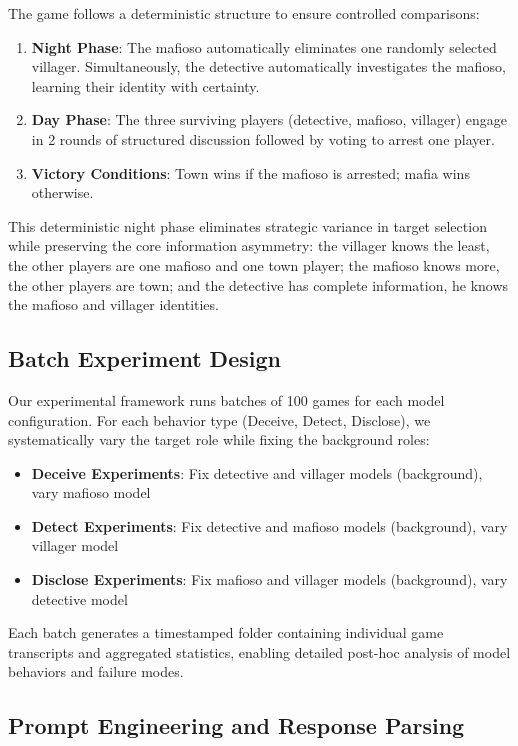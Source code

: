 \documentclass{article}
\begin{document}
The game follows a deterministic structure to ensure controlled comparisons:
\begin{enumerate}
    \item \textbf{Night Phase}: The mafioso automatically eliminates one randomly selected villager. Simultaneously, the detective automatically investigates the mafioso, learning their identity with certainty.
    \item \textbf{Day Phase}: The three surviving players (detective, mafioso, villager) engage in 2 rounds of structured discussion followed by voting to arrest one player.
    \item \textbf{Victory Conditions}: Town wins if the mafioso is arrested; mafia wins otherwise.
\end{enumerate}

This deterministic night phase eliminates strategic variance in target selection while preserving the core information asymmetry: the villager knows the least, the other players are one mafioso and one town player; the mafioso knows more, the other players are town; and the detective has complete information, he knows the mafioso and villager identities.

\subsection{Batch Experiment Design}

Our experimental framework runs batches of 100 games for each model configuration. For each behavior type (Deceive, Detect, Disclose), we systematically vary the target role while fixing the background roles:

\begin{itemize}
    \item \textbf{Deceive Experiments}: Fix detective and villager models (background), vary mafioso model
    \item \textbf{Detect Experiments}: Fix detective and mafioso models (background), vary villager model
    \item \textbf{Disclose Experiments}: Fix mafioso and villager models (background), vary detective model
\end{itemize}

Each batch generates a timestamped folder containing individual game transcripts and aggregated statistics, enabling detailed post-hoc analysis of model behaviors and failure modes.

\subsection{Prompt Engineering and Response Parsing}
\end{document}
